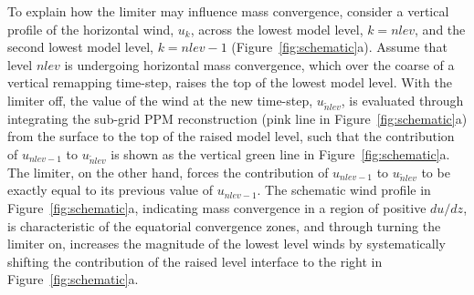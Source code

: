 \documentclass{agujournal}
\begin{document}
{To explain how the limiter may influence mass convergence, consider a vertical profile of the horizontal wind, $u_k$, across the lowest model level, $k=nlev$, and the second lowest model level, $k=nlev-1$ (Figure~\ref{fig:schematic}a). Assume that level $nlev$ is undergoing horizontal mass convergence, which over the coarse of a vertical remapping time-step, raises the top of the lowest model level. With the limiter off, the value of the wind at the new time-step, $u_{\tilde nlev}$, is evaluated through integrating the sub-grid PPM reconstruction (pink line in Figure~\ref{fig:schematic}a) from the surface to the top of the raised model level, such that the contribution of $u_{nlev-1}$ to $u_{\tilde nlev}$ is shown as the vertical green line in Figure~\ref{fig:schematic}a. The limiter, on the other hand, forces the contribution of $u_{nlev-1}$ to $u_{\tilde nlev}$ to be exactly equal to its previous value of $u_{nlev-1}$. The schematic wind profile in Figure~\ref{fig:schematic}a, indicating mass convergence in a region of positive $du/dz$, is characteristic of the equatorial convergence zones, and through turning the limiter on, increases the magnitude of the lowest level winds by systematically shifting the contribution of the raised level interface to the right in Figure~\ref{fig:schematic}a.




}
\end{document}
